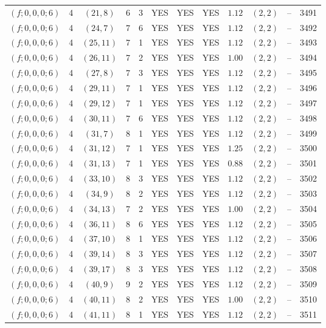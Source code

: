\begin{longtable}{|c|c|c|c|c|c|c|c|c|c|c|c|}
$(f;0,0,0;6)$ & 4 & $(21,8)$ & 6 & 3 & YES & YES & YES & $1.12$ & $(2,2)$ & -- & 3491\\
$(f;0,0,0;6)$ & 4 & $(24,7)$ & 7 & 6 & YES & YES & YES & $1.12$ & $(2,2)$ & -- & 3492\\
$(f;0,0,0;6)$ & 4 & $(25,11)$ & 7 & 1 & YES & YES & YES & $1.12$ & $(2,2)$ & -- & 3493\\
$(f;0,0,0;6)$ & 4 & $(26,11)$ & 7 & 2 & YES & YES & YES & $1.00$ & $(2,2)$ & -- & 3494\\
$(f;0,0,0;6)$ & 4 & $(27,8)$ & 7 & 3 & YES & YES & YES & $1.12$ & $(2,2)$ & -- & 3495\\
$(f;0,0,0;6)$ & 4 & $(29,11)$ & 7 & 1 & YES & YES & YES & $1.12$ & $(2,2)$ & -- & 3496\\
$(f;0,0,0;6)$ & 4 & $(29,12)$ & 7 & 1 & YES & YES & YES & $1.12$ & $(2,2)$ & -- & 3497\\
$(f;0,0,0;6)$ & 4 & $(30,11)$ & 7 & 6 & YES & YES & YES & $1.12$ & $(2,2)$ & -- & 3498\\
$(f;0,0,0;6)$ & 4 & $(31,7)$ & 8 & 1 & YES & YES & YES & $1.12$ & $(2,2)$ & -- & 3499\\
$(f;0,0,0;6)$ & 4 & $(31,12)$ & 7 & 1 & YES & YES & YES & $1.25$ & $(2,2)$ & -- & 3500\\
$(f;0,0,0;6)$ & 4 & $(31,13)$ & 7 & 1 & YES & YES & YES & $0.88$ & $(2,2)$ & -- & 3501\\
$(f;0,0,0;6)$ & 4 & $(33,10)$ & 8 & 3 & YES & YES & YES & $1.12$ & $(2,2)$ & -- & 3502\\
$(f;0,0,0;6)$ & 4 & $(34,9)$ & 8 & 2 & YES & YES & YES & $1.12$ & $(2,2)$ & -- & 3503\\
$(f;0,0,0;6)$ & 4 & $(34,13)$ & 7 & 2 & YES & YES & YES & $1.00$ & $(2,2)$ & -- & 3504\\
$(f;0,0,0;6)$ & 4 & $(36,11)$ & 8 & 6 & YES & YES & YES & $1.12$ & $(2,2)$ & -- & 3505\\
$(f;0,0,0;6)$ & 4 & $(37,10)$ & 8 & 1 & YES & YES & YES & $1.12$ & $(2,2)$ & -- & 3506\\
$(f;0,0,0;6)$ & 4 & $(39,14)$ & 8 & 3 & YES & YES & YES & $1.12$ & $(2,2)$ & -- & 3507\\
$(f;0,0,0;6)$ & 4 & $(39,17)$ & 8 & 3 & YES & YES & YES & $1.12$ & $(2,2)$ & -- & 3508\\
$(f;0,0,0;6)$ & 4 & $(40,9)$ & 9 & 2 & YES & YES & YES & $1.12$ & $(2,2)$ & -- & 3509\\
$(f;0,0,0;6)$ & 4 & $(40,11)$ & 8 & 2 & YES & YES & YES & $1.00$ & $(2,2)$ & -- & 3510\\
$(f;0,0,0;6)$ & 4 & $(41,11)$ & 8 & 1 & YES & YES & YES & $1.12$ & $(2,2)$ & -- & 3511\\

\end{longtable}

